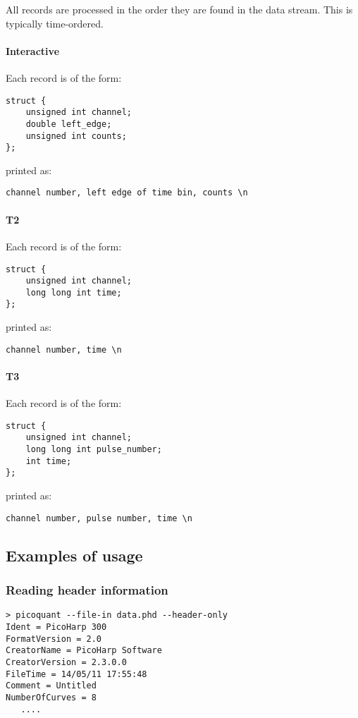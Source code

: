 \documentclass{article}
\begin{document}
All records are processed in the order they are found in the data stream. This is typically time-ordered.

\paragraph{Interactive}
Each record is of the form:
\begin{verbatim}
struct {
    unsigned int channel;
    double left_edge;
    unsigned int counts;
};
\end{verbatim}
printed as:
\begin{verbatim}
channel number, left edge of time bin, counts \n
\end{verbatim}

\paragraph{T2}
Each record is of the form:
\begin{verbatim}
struct {
    unsigned int channel;
    long long int time;
};
\end{verbatim}
printed as:
\begin{verbatim}
channel number, time \n
\end{verbatim}

\paragraph{T3}
Each record is of the form:
\begin{verbatim}
struct {
	unsigned int channel;
	long long int pulse_number;
	int time;
};
\end{verbatim}
printed as:
\begin{verbatim}
channel number, pulse number, time \n
\end{verbatim}
	
\subsection{Examples of usage}
\subsubsection{Reading header information}
\begin{verbatim}
> picoquant --file-in data.phd --header-only
Ident = PicoHarp 300
FormatVersion = 2.0
CreatorName = PicoHarp Software
CreatorVersion = 2.3.0.0
FileTime = 14/05/11 17:55:48
Comment = Untitled
NumberOfCurves = 8
   ....
\end{verbatim}
\end{document}
